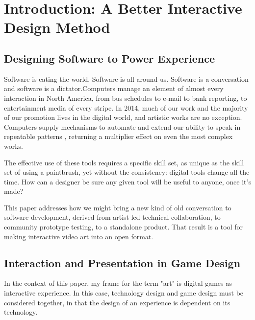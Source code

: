 \chapter{Introduction: A Better Interactive Design Method}\thispagestyle{empty} %

\label{Chapter1} %

\section{Designing Software to Power Experience}
Software is eating the world. Software is all around us. Software is a conversation and software is a dictator.Computers manage an element of almost every interaction in North America, from bus schedules to e-mail to bank reporting, to entertainment media of every stripe. In 2014, much of our work and the majority of our promotion lives in the digital world, and artistic works are no exception. Computers supply mechanisms to automate and extend our ability to speak in repeatable patterns \parencite{glanville}, returning a multiplier effect on even the most complex works.

The effective use of these tools requires a specific skill set, as unique as the skill set of using a paintbrush, yet without the consistency: digital tools change all the time. How can a designer be sure any given tool will be useful to anyone, once it's made?

This paper addresses how we might bring a new kind of old conversation to software development, derived from artist-led technical collaboration, to community prototype testing, to a standalone product. That result is a tool for making interactive video art into an open format.

\section{Interaction and Presentation in Game Design}
In the context of this paper, my frame for the term "art" is digital games as interactive experience. In this case, technology design and game design must be considered together, in that the design of an experience is dependent on its technology.

